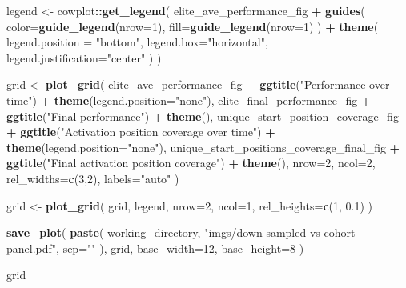 \documentclass[]{book}
\newenvironment{Shaded}{\begin{snugshade}}{\end{snugshade}}
\newcommand{\DataTypeTok}[1]{\textcolor[rgb]{0.13,0.29,0.53}{#1}}
\newcommand{\DecValTok}[1]{\textcolor[rgb]{0.00,0.00,0.81}{#1}}
\newcommand{\FloatTok}[1]{\textcolor[rgb]{0.00,0.00,0.81}{#1}}
\newcommand{\KeywordTok}[1]{\textcolor[rgb]{0.13,0.29,0.53}{\textbf{#1}}}
\newcommand{\NormalTok}[1]{#1}
\newcommand{\OperatorTok}[1]{\textcolor[rgb]{0.81,0.36,0.00}{\textbf{#1}}}
\newcommand{\StringTok}[1]{\textcolor[rgb]{0.31,0.60,0.02}{#1}}
\begin{document}
\begin{Shaded}
\begin{Highlighting}[]
\NormalTok{legend <-}\StringTok{ }\NormalTok{cowplot}\OperatorTok{::}\KeywordTok{get_legend}\NormalTok{(}
\NormalTok{    elite_ave_performance_fig }\OperatorTok{+}
\StringTok{      }\KeywordTok{guides}\NormalTok{(}
        \DataTypeTok{color=}\KeywordTok{guide_legend}\NormalTok{(}\DataTypeTok{nrow=}\DecValTok{1}\NormalTok{),}
        \DataTypeTok{fill=}\KeywordTok{guide_legend}\NormalTok{(}\DataTypeTok{nrow=}\DecValTok{1}\NormalTok{)}
\NormalTok{      ) }\OperatorTok{+}
\StringTok{      }\KeywordTok{theme}\NormalTok{(}
        \DataTypeTok{legend.position =} \StringTok{"bottom"}\NormalTok{,}
        \DataTypeTok{legend.box=}\StringTok{"horizontal"}\NormalTok{,}
        \DataTypeTok{legend.justification=}\StringTok{"center"}
\NormalTok{      )}
\NormalTok{  )}

\NormalTok{grid <-}\StringTok{ }\KeywordTok{plot_grid}\NormalTok{(}
\NormalTok{  elite_ave_performance_fig }\OperatorTok{+}
\StringTok{    }\KeywordTok{ggtitle}\NormalTok{(}\StringTok{"Performance over time"}\NormalTok{) }\OperatorTok{+}
\StringTok{    }\KeywordTok{theme}\NormalTok{(}\DataTypeTok{legend.position=}\StringTok{"none"}\NormalTok{),}
\NormalTok{  elite_final_performance_fig }\OperatorTok{+}
\StringTok{    }\KeywordTok{ggtitle}\NormalTok{(}\StringTok{"Final performance"}\NormalTok{) }\OperatorTok{+}
\StringTok{    }\KeywordTok{theme}\NormalTok{(),}
\NormalTok{  unique_start_position_coverage_fig }\OperatorTok{+}
\StringTok{    }\KeywordTok{ggtitle}\NormalTok{(}\StringTok{"Activation position coverage over time"}\NormalTok{) }\OperatorTok{+}
\StringTok{    }\KeywordTok{theme}\NormalTok{(}\DataTypeTok{legend.position=}\StringTok{"none"}\NormalTok{),}
\NormalTok{  unique_start_positions_coverage_final_fig }\OperatorTok{+}
\StringTok{    }\KeywordTok{ggtitle}\NormalTok{(}\StringTok{"Final activation position coverage"}\NormalTok{) }\OperatorTok{+}
\StringTok{    }\KeywordTok{theme}\NormalTok{(),}
  \DataTypeTok{nrow=}\DecValTok{2}\NormalTok{,}
  \DataTypeTok{ncol=}\DecValTok{2}\NormalTok{,}
  \DataTypeTok{rel_widths=}\KeywordTok{c}\NormalTok{(}\DecValTok{3}\NormalTok{,}\DecValTok{2}\NormalTok{),}
  \DataTypeTok{labels=}\StringTok{"auto"}
\NormalTok{)}

\NormalTok{grid <-}\StringTok{ }\KeywordTok{plot_grid}\NormalTok{(}
\NormalTok{  grid,}
\NormalTok{  legend,}
  \DataTypeTok{nrow=}\DecValTok{2}\NormalTok{,}
  \DataTypeTok{ncol=}\DecValTok{1}\NormalTok{,}
  \DataTypeTok{rel_heights=}\KeywordTok{c}\NormalTok{(}\DecValTok{1}\NormalTok{, }\FloatTok{0.1}\NormalTok{)}
\NormalTok{)}

\KeywordTok{save_plot}\NormalTok{(}
  \KeywordTok{paste}\NormalTok{(}
\NormalTok{    working_directory,}
    \StringTok{"imgs/down-sampled-vs-cohort-panel.pdf"}\NormalTok{,}
    \DataTypeTok{sep=}\StringTok{""}
\NormalTok{  ),}
\NormalTok{  grid,}
  \DataTypeTok{base_width=}\DecValTok{12}\NormalTok{,}
  \DataTypeTok{base_height=}\DecValTok{8}
\NormalTok{)}

\NormalTok{grid}
\end{Highlighting}
\end{Shaded}
\end{document}
